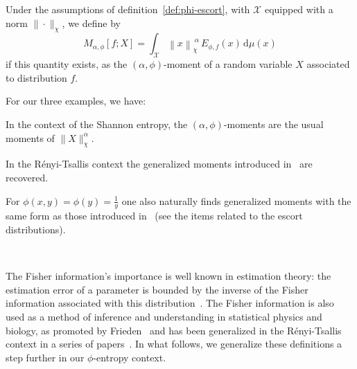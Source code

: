 \documentclass[entropy,article,submit,moreauthors,pdftex]{Definitions/mdpi}
\newcounter{GaussExample}%
\newcounter{qGaussExample}%
\newcounter{arcsineExample}%
\def\dmu{\mathrm{d}\mu}%
\def\X{\mathcal{X}}%
\begin{document}
\begin{Definition}
\label{def:phi-moment}
%
  Under the  assumptions of  definition~\ref{def:phi-escort}, with  $\X$ equipped
  with a norm $\| \cdot \|_\chi$, we define by
  \begin{equation}\label{eq:phi-moment}
  M_{\alpha,\phi}[f;X] = \int_\X \left\| x \right\|_\chi^{\: \alpha} \,
  E_{\phi,f}(x) \, \dmu(x)
  \end{equation}
  if this  quantity exists, as  the $(\alpha,\phi)$-moment of a  random variable
  $X$ associated to distribution $f$.
\end{Definition}
%
For our three examples, we have:
%
\begin{Example}
  In the  context of  the Shannon entropy,  the $(\alpha,\phi)$-moments  are the
  usual moments of $\|X\|_\chi^\alpha$.
\end{Example}
%
\begin{Example}
  In   the   R\'enyi-Tsallis   context   the   generalized   moments   introduced
  in~\cite{TsaMen98, MarNic00} are recovered.
\end{Example}
%
\begin{Example}
  For $\phi(x,y) =  \phi(y) = \frac{1}{y}$ one also  naturally finds generalized
  moments with  the same form  as those introduced  in~\cite{TsaMen98, MarNic00}
  (see the items related to the escort distributions).
\end{Example}

\

The  Fisher information's  importance is  well known  in estimation  theory: the
estimation  error  of a  parameter  is  bounded by  the  inverse  of the  Fisher
information associated with this distribution~\cite{Kay93, CovTho06}. The Fisher
information  is  also  used  as  a method  of  inference  and  understanding  in
statistical physics  and biology,  as promoted  by Frieden~\cite{Fri04}  and has
been   generalized   in   the   R\'enyi-Tsallis   context   in   a   series   of
papers~\cite{Ham78,   ChiPen00,   CasChi02,   LutYan05,   LutLv12,   Ber12:06_1,
  Ber12:06_2, Ber13}.  In  what follows, we generalize these  definitions a step
further in our $\phi$-entropy context.
\end{document}
